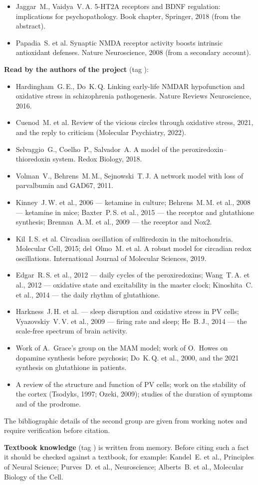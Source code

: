 {\begin{itemize}
\item Jaggar~M., Vaidya~V.\,A. 5-HT2A receptors and BDNF regulation: implications for psychopathology. Book chapter, Springer, 2018 (from the abstract).
\item Papadia~S. et al. Synaptic NMDA receptor activity boosts intrinsic antioxidant defenses. Nature Neuroscience, 2008 (from a secondary account).
\end{itemize}
\textbf{Read by the authors of the project} (tag \tS):
\begin{itemize}
\item Hardingham~G.\,E., Do~K.\,Q. Linking early-life NMDAR hypofunction and oxidative stress in schizophrenia pathogenesis. Nature Reviews Neuroscience, 2016.
\item Cuenod~M. et al. Review of the vicious circles through oxidative stress, 2021, and the reply to criticism (Molecular Psychiatry, 2022).
\item Selvaggio~G., Coelho~P., Salvador~A. A model of the peroxiredoxin--thioredoxin system. Redox Biology, 2018.
\item Volman~V., Behrens~M.\,M., Sejnowski~T.\,J. A network model with loss of parvalbumin and GAD67, 2011.
\item Kinney~J.\,W. et al., 2006 --- ketamine in culture; Behrens~M.\,M. et al., 2008 --- ketamine in mice; Baxter~P.\,S. et al., 2015 --- the receptor and glutathione synthesis; Brennan~A.\,M. et al., 2009 --- the receptor and Nox2.
\item Kil~I.\,S. et al. Circadian oscillation of sulfiredoxin in the mitochondria. Molecular Cell, 2015; del~Olmo~M. et al. A robust model for circadian redox oscillations. International Journal of Molecular Sciences, 2019.
\item Edgar~R.\,S. et al., 2012 --- daily cycles of the peroxiredoxins; Wang~T.\,A. et al., 2012 --- oxidative state and excitability in the master clock; Kinoshita~C. et al., 2014 --- the daily rhythm of glutathione.
\item Harkness~J.\,H. et al. --- sleep disruption and oxidative stress in PV cells; Vyazovskiy~V.\,V. et al., 2009 --- firing rate and sleep; He~B.\,J., 2014 --- the scale-free spectrum of brain activity.
\item Work of A.~Grace's group on the MAM model; work of O.~Howes on dopamine synthesis before psychosis; Do~K.\,Q. et al., 2000, and the 2021 synthesis on glutathione in patients.
\item A review of the structure and function of PV cells; work on the stability of the cortex (Tsodyks, 1997; Ozeki, 2009); studies of the duration of symptoms and of the prodrome.
\end{itemize}
The bibliographic details of the second group are given from working notes and require verification before citation.

\textbf{Textbook knowledge} (tag \tU) is written from memory. Before citing such a fact it should be checked against a textbook, for example: Kandel~E. et al., Principles of Neural Science; Purves~D. et al., Neuroscience; Alberts~B. et al., Molecular Biology of the Cell.
}
